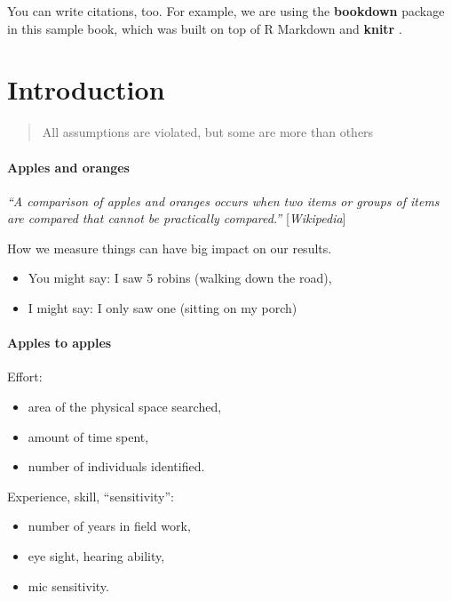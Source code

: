 \documentclass[12pt,]{book}
\providecommand{\tightlist}{%
  \setlength{\itemsep}{0pt}\setlength{\parskip}{0pt}}
\begin{document}
You can write citations, too. For example, we are using the \textbf{bookdown} package \citep{R-bookdown} in this sample book, which was built on top of R Markdown and \textbf{knitr} \citep{xie2015}.

\hypertarget{intro}{%
\chapter{Introduction}\label{intro}}

\begin{quote}
All assumptions are violated, but some are more than others
\end{quote}

\hypertarget{apples-and-oranges}{%
\subsubsection{Apples and oranges}\label{apples-and-oranges}}

\emph{``A comparison of apples and oranges occurs when two items or groups of items are compared that
cannot be practically compared.''} {[}\emph{Wikipedia}{]}

How we measure things can have big impact on our results.

\begin{itemize}
\tightlist
\item
  You might say: I saw 5 robins (walking down the road),
\item
  I might say: I only saw one (sitting on my porch)
\end{itemize}

\hypertarget{apples-to-apples}{%
\subsubsection{Apples to apples}\label{apples-to-apples}}

Effort:

\begin{itemize}
\tightlist
\item
  area of the physical space searched,
\item
  amount of time spent,
\item
  number of individuals identified.
\end{itemize}

Experience, skill, ``sensitivity'':

\begin{itemize}
\tightlist
\item
  number of years in field work,
\item
  eye sight, hearing ability,
\item
  mic sensitivity.
\end{itemize}
\end{document}

